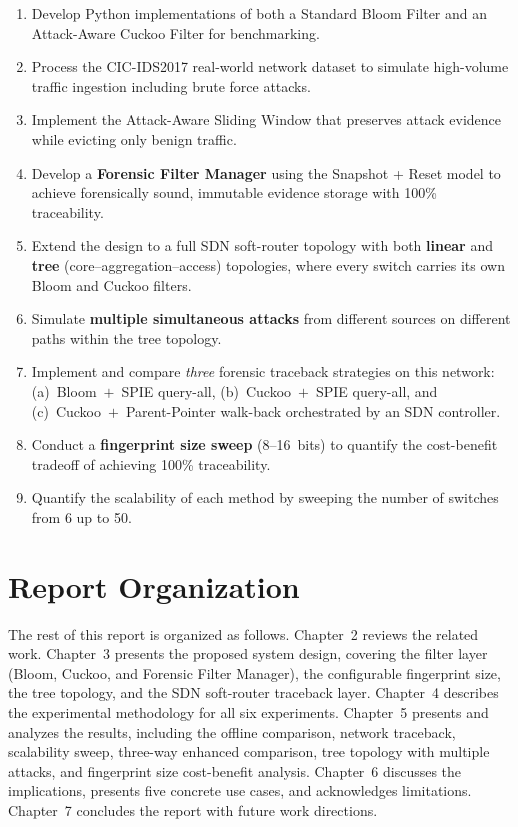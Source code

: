 \documentclass[12pt, a4paper]{report}
\begin{document}
\begin{enumerate}[leftmargin=*, label=\textbf{\arabic*.}]
  \item Develop Python implementations of both a Standard Bloom Filter and
  an Attack-Aware Cuckoo Filter for benchmarking.
  \item Process the CIC-IDS2017 real-world network dataset to simulate
  high-volume traffic ingestion including brute force attacks.
  \item Implement the Attack-Aware Sliding Window that preserves attack
  evidence while evicting only benign traffic.
  \item Develop a \textbf{Forensic Filter Manager} using the Snapshot +
  Reset model to achieve forensically sound, immutable evidence storage
  with 100\% traceability.
  \item Extend the design to a full SDN soft-router topology with both
  \textbf{linear} and \textbf{tree} (core--aggregation--access) topologies,
  where every switch carries its own Bloom and Cuckoo filters.
  \item Simulate \textbf{multiple simultaneous attacks} from different
  sources on different paths within the tree topology.
  \item Implement and compare \textit{three} forensic traceback strategies
  on this network: (a)~Bloom~$+$~SPIE query-all, (b)~Cuckoo~$+$~SPIE
  query-all, and (c)~Cuckoo~$+$~Parent-Pointer walk-back orchestrated by
  an SDN controller.
  \item Conduct a \textbf{fingerprint size sweep} (8--16~bits) to
  quantify the cost-benefit tradeoff of achieving 100\% traceability.
  \item Quantify the scalability of each method by sweeping the number of
  switches from 6 up to 50.
\end{enumerate}

\section{Report Organization}

The rest of this report is organized as follows. Chapter~2 reviews the
related work. Chapter~3 presents the proposed system design, covering
the filter layer (Bloom, Cuckoo, and Forensic Filter Manager), the
configurable fingerprint size, the tree topology, and the SDN
soft-router traceback layer. Chapter~4 describes the experimental
methodology for all six experiments. Chapter~5 presents and analyzes
the results, including the offline comparison, network traceback,
scalability sweep, three-way enhanced comparison, tree topology with
multiple attacks, and fingerprint size cost-benefit analysis. Chapter~6
discusses the implications, presents five concrete use cases, and
acknowledges limitations. Chapter~7 concludes the report with future
work directions.
\end{document}
